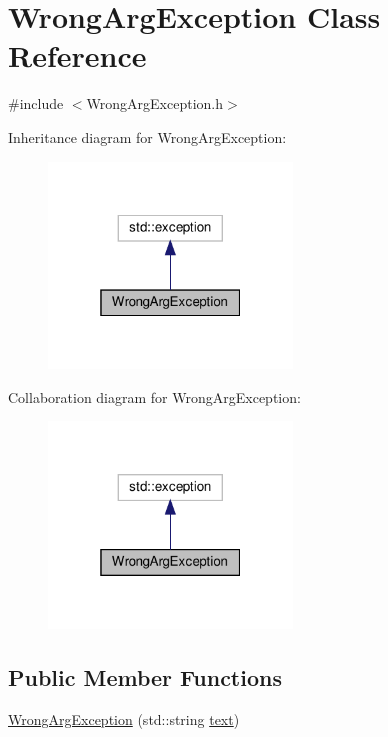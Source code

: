 \hypertarget{class_wrong_arg_exception}{}\section{Wrong\+Arg\+Exception Class Reference}
\label{class_wrong_arg_exception}


{\ttfamily \#include $<$Wrong\+Arg\+Exception.\+h$>$}



Inheritance diagram for Wrong\+Arg\+Exception\+:\nopagebreak
\begin{figure}[H]
\begin{center}
\leavevmode
\includegraphics[width=184pt]{class_wrong_arg_exception__inherit__graph}
\end{center}
\end{figure}


Collaboration diagram for Wrong\+Arg\+Exception\+:\nopagebreak
\begin{figure}[H]
\begin{center}
\leavevmode
\includegraphics[width=184pt]{class_wrong_arg_exception__coll__graph}
\end{center}
\end{figure}
\subsection*{Public Member Functions}
\begin{DoxyCompactItemize}
\item 
\hyperlink{class_wrong_arg_exception_a9462f257043ca3fa9bace884a103b67e}{Wrong\+Arg\+Exception} (std\+::string \hyperlink{class_wrong_arg_exception_a8ed636869cba7a41440f63795fef9ede}{text})
\end{DoxyCompactItemize}
